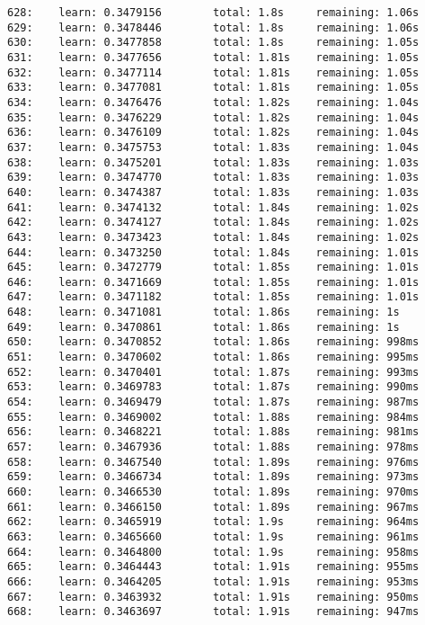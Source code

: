 \documentclass[11pt]{article}
\begin{document}
\begin{Verbatim}[commandchars=\\\{\}]
628:    learn: 0.3479156        total: 1.8s     remaining: 1.06s
629:    learn: 0.3478446        total: 1.8s     remaining: 1.06s
630:    learn: 0.3477858        total: 1.8s     remaining: 1.05s
631:    learn: 0.3477656        total: 1.81s    remaining: 1.05s
632:    learn: 0.3477114        total: 1.81s    remaining: 1.05s
633:    learn: 0.3477081        total: 1.81s    remaining: 1.05s
634:    learn: 0.3476476        total: 1.82s    remaining: 1.04s
635:    learn: 0.3476229        total: 1.82s    remaining: 1.04s
636:    learn: 0.3476109        total: 1.82s    remaining: 1.04s
637:    learn: 0.3475753        total: 1.83s    remaining: 1.04s
638:    learn: 0.3475201        total: 1.83s    remaining: 1.03s
639:    learn: 0.3474770        total: 1.83s    remaining: 1.03s
640:    learn: 0.3474387        total: 1.83s    remaining: 1.03s
641:    learn: 0.3474132        total: 1.84s    remaining: 1.02s
642:    learn: 0.3474127        total: 1.84s    remaining: 1.02s
643:    learn: 0.3473423        total: 1.84s    remaining: 1.02s
644:    learn: 0.3473250        total: 1.84s    remaining: 1.01s
645:    learn: 0.3472779        total: 1.85s    remaining: 1.01s
646:    learn: 0.3471669        total: 1.85s    remaining: 1.01s
647:    learn: 0.3471182        total: 1.85s    remaining: 1.01s
648:    learn: 0.3471081        total: 1.86s    remaining: 1s
649:    learn: 0.3470861        total: 1.86s    remaining: 1s
650:    learn: 0.3470852        total: 1.86s    remaining: 998ms
651:    learn: 0.3470602        total: 1.86s    remaining: 995ms
652:    learn: 0.3470401        total: 1.87s    remaining: 993ms
653:    learn: 0.3469783        total: 1.87s    remaining: 990ms
654:    learn: 0.3469479        total: 1.87s    remaining: 987ms
655:    learn: 0.3469002        total: 1.88s    remaining: 984ms
656:    learn: 0.3468221        total: 1.88s    remaining: 981ms
657:    learn: 0.3467936        total: 1.88s    remaining: 978ms
658:    learn: 0.3467540        total: 1.89s    remaining: 976ms
659:    learn: 0.3466734        total: 1.89s    remaining: 973ms
660:    learn: 0.3466530        total: 1.89s    remaining: 970ms
661:    learn: 0.3466150        total: 1.89s    remaining: 967ms
662:    learn: 0.3465919        total: 1.9s     remaining: 964ms
663:    learn: 0.3465660        total: 1.9s     remaining: 961ms
664:    learn: 0.3464800        total: 1.9s     remaining: 958ms
665:    learn: 0.3464443        total: 1.91s    remaining: 955ms
666:    learn: 0.3464205        total: 1.91s    remaining: 953ms
667:    learn: 0.3463932        total: 1.91s    remaining: 950ms
668:    learn: 0.3463697        total: 1.91s    remaining: 947ms

\end{Verbatim}
\end{document}
